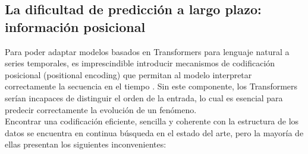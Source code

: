 \subsection{La dificultad de predicción a largo plazo: información posicional}

Para poder adaptar modelos basados en Transformers para lenguaje natural a series temporales,  es imprescindible introducir mecanismos de codificación posicional (positional encoding) que permitan al modelo interpretar correctamente la secuencia en el tiempo \cite{irani2025positionalencodingtransformerbasedtime}. Sin este componente, los Transformers serían incapaces de distinguir el orden de la entrada, lo cual es esencial para predecir correctamente la evolución de un fenómeno.\\

Encontrar una codificación eficiente, sencilla y coherente con la estructura de los datos se encuentra en continua búsqueda en el estado del arte, pero la mayoría de ellas presentan los siguientes inconvenientes:

